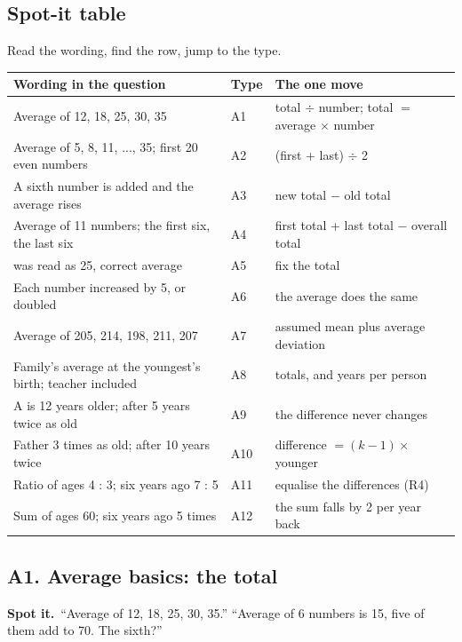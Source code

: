\documentclass[11pt,a4paper]{article}
\let\oldsubsection\subsection
\renewcommand{\subsection}{\needspace{9\baselineskip}\oldsubsection}
\newcommand{\spot}{\textbf{\color{ember}Spot it.}\ }
\begin{document}
\subsection*{Spot-it table}
Read the wording, find the row, jump to the type.
\begin{center}\small\renewcommand{\arraystretch}{1.18}\setlength{\tabcolsep}{7pt}
\begin{tabularx}{\linewidth}{@{}>{\raggedright\arraybackslash}X l >{\raggedright\arraybackslash}X@{}}
\toprule
\textbf{\color{slate}Wording in the question} & \textbf{\color{slate}Type} & \textbf{\color{slate}The one move} \\ \midrule
Average of 12, 18, 25, 30, 35 & A1 & total $\div$ number; total $=$ average $\times$ number \\
Average of 5, 8, 11, ..., 35; first 20 even numbers & A2 & (first + last) $\div$ 2 \\
A sixth number is added and the average rises & A3 & new total $-$ old total \\
Average of 11 numbers; the first six, the last six & A4 & first total + last total $-$ overall total \\
52 was read as 25, correct average & A5 & fix the total \\
Each number increased by 5, or doubled & A6 & the average does the same \\
Average of 205, 214, 198, 211, 207 & A7 & assumed mean plus average deviation \\
Family's average at the youngest's birth; teacher included & A8 & totals, and years per person \\
A is 12 years older; after 5 years twice as old & A9 & the difference never changes \\
Father 3 times as old; after 10 years twice & A10 & difference $=(k-1)\times$ younger \\
Ratio of ages 4 : 3; six years ago 7 : 5 & A11 & equalise the differences (R4) \\
Sum of ages 60; six years ago 5 times & A12 & the sum falls by 2 per year back \\
\bottomrule
\end{tabularx}\end{center}

\subsection{A1. Average basics: the total}
\spot ``Average of 12, 18, 25, 30, 35.'' ``Average of 6 numbers is 15, five of them add to 70. The sixth?''
\end{document}

